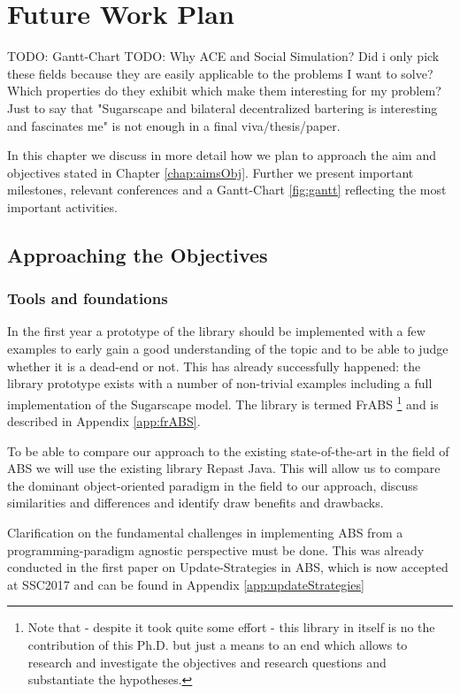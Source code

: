 \chapter{Future Work Plan}
\label{chap:future}

TODO: Gantt-Chart
TODO: Why ACE and Social Simulation? Did i only pick these fields because they are easily applicable to the problems I want to solve? Which properties do they exhibit which make them interesting for my problem? Just to say that "Sugarscape and bilateral decentralized bartering is interesting and fascinates me" is not enough in a final viva/thesis/paper.	

In this chapter we discuss in more detail how we plan to approach the aim and objectives stated in Chapter \ref{chap:aimsObj}. Further we present important milestones, relevant conferences and a Gantt-Chart \ref{fig:gantt} reflecting the most important activities.

\section{Approaching the Objectives}

\subsection{Tools and foundations}
In the first year a prototype of the library should be implemented with a few examples to early gain a good understanding of the topic and to be able to judge whether it is a dead-end or not. This has already successfully happened: the library prototype exists with a number of non-trivial examples including a full implementation of the Sugarscape model. The library is termed FrABS \footnote{Note that - despite it took quite some effort - this library in itself is no the contribution of this Ph.D. but just a means to an end which allows to research and investigate the objectives and research questions and substantiate the hypotheses.} and is described in Appendix \ref{app:frABS}.

To be able to compare our approach to the existing state-of-the-art in the field of ABS we will use the existing library Repast Java. This will allow us to compare the dominant object-oriented paradigm in the field to our approach, discuss similarities and differences and identify draw benefits and drawbacks. 

Clarification on the fundamental challenges in implementing ABS from a programming-paradigm agnostic perspective must be done. This was already conducted in the first paper on Update-Strategies in ABS, which is now accepted at SSC2017 and can be found in Appendix \ref{app:updateStrategies}

